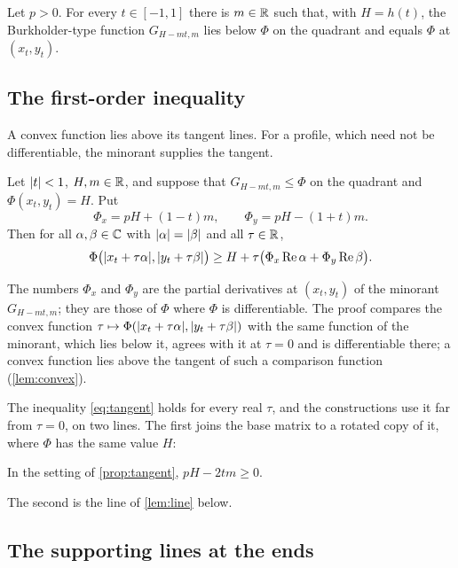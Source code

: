 \begin{lemma}\label{lem:minorant}
Let $p>0$. For every $t\in[-1,1]$ there is $m\in\mathbb{R}$ such that, with $H=h(t)$, the
Burkholder-type function $G_{H-mt,m}$ lies below $\Phi$ on the quadrant and equals $\Phi$ at
$(x_t,y_t)$.
\end{lemma}

\subsection{The first-order inequality}

A convex function lies above its tangent lines. For a profile, which need not be differentiable,
the minorant supplies the tangent.

\begin{proposition}\label{prop:tangent}
Let $\lvert t\rvert<1$, $H,m\in\mathbb{R}$, and suppose that $G_{H-mt,m}\le\Phi$ on the quadrant and
$\Phi(x_t,y_t)=H$. Put
\[
  \Phi_x=pH+(1-t)m,\qquad\Phi_y=pH-(1+t)m .
\]
Then for all $\alpha,\beta\in\mathbb{C}$ with $\lvert \alpha\rvert=\lvert \beta\rvert$ and all $\tau\in\mathbb{R}$,
\begin{equation}\label{eq:tangent}
  \Phi\bigl(\lvert x_t+\tau\alpha\rvert,\lvert y_t+\tau\beta\rvert\bigr)\ge
  H+\tau\bigl(\Phi_x\operatorname{Re}\alpha+\Phi_y\operatorname{Re}\beta\bigr).
\end{equation}
\end{proposition}

The numbers $\Phi_x$ and $\Phi_y$ are the partial derivatives at $(x_t,y_t)$ of the minorant
$G_{H-mt,m}$; they are those of $\Phi$ where $\Phi$ is differentiable. The proof compares the
convex function $\tau\mapsto\Phi(\lvert x_t+\tau\alpha\rvert,\lvert y_t+\tau\beta\rvert)$ with the same
function of the minorant, which lies below it, agrees with it at $\tau=0$ and is differentiable
there; a convex function lies above the tangent of such a comparison function
(\cref{lem:convex}).

The inequality \eqref{eq:tangent} holds for every real $\tau$, and the constructions use it far
from $\tau=0$, on two lines. The first joins the base matrix to a rotated copy of it, where
$\Phi$ has the same value $H$:

\begin{corollary}\label{cor:BE}
In the setting of \cref{prop:tangent}, $pH-2tm\ge0$.
\end{corollary}

The second is the line of \cref{lem:line} below.

\subsection{The supporting lines at the ends}

